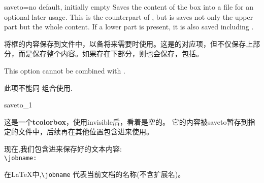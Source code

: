 \begin{docTcbKey}[][doc new=2015-05-04]{saveto}{=}{no default, initially empty}
Saves the content of the box into a file for an optional later usage.
This is the counterpart of , but is saves not
only the upper part but the whole content. If a lower part is present,
it is also saved including .


将框的内容保存到文件中，以备将来需要时使用。这是的对应项，但不仅保存上部分，而是保存整个内容。如果存在下部分，则也会保存，包括。

\begin{marker}
This option cannot be combined with .

此项不能同  组合使用.
\end{marker}

\begin{exdispExample}{saveto_1}
\begin{tcolorbox}[invisible%
,saveto=\jobname_mysave1.tex
,colback=white]
这是一个\textbf{tcolorbox}，使用invisible后，看着是空的。
它的内容被saveto暂存到指定的文件中，后续再在其他位置包含进来使用。
\end{tcolorbox}

现在,我们包含进来保存好的文本内容:\\


\verb|\jobname:|\jobname

在LaTeX中,\verb|\jobname| 代表当前文档的名称(不含扩展名)。
\end{exdispExample}










\end{docTcbKey}
